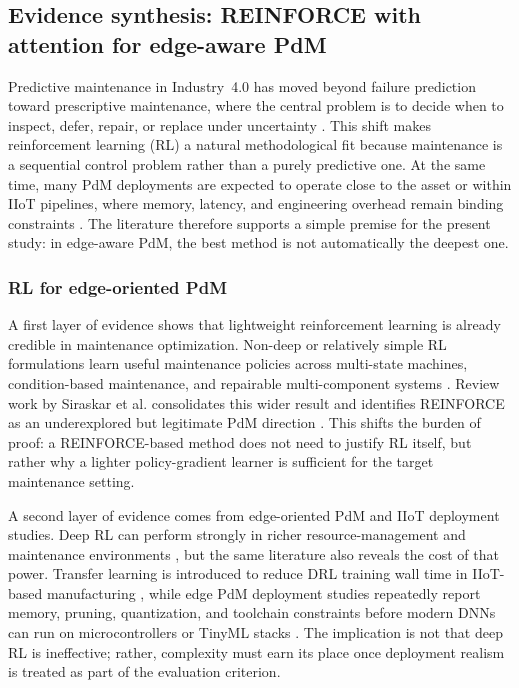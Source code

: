 \documentclass[refree,sn-basic]{sn-jnl} %
\begin{document}
\subsection{Evidence synthesis: REINFORCE with attention for edge-aware PdM}
\label{sec:reinforce_attention_pdm}

Predictive maintenance in Industry~4.0 has moved beyond failure prediction toward prescriptive maintenance, where the central problem is to decide when to inspect, defer, repair, or replace under uncertainty \cite{Com20,Ans19,Sir23,Zha24b}. This shift makes reinforcement learning (RL) a natural methodological fit because maintenance is a sequential control problem rather than a purely predictive one. At the same time, many PdM deployments are expected to operate close to the asset or within IIoT pipelines, where memory, latency, and engineering overhead remain binding constraints \cite{Com20,Pan23,Njo24}. The literature therefore supports a simple premise for the present study: in edge-aware PdM, the best method is not automatically the deepest one.

\subsubsection{RL for edge-oriented PdM}
A first layer of evidence shows that lightweight reinforcement learning is already credible in maintenance optimization. Non-deep or relatively simple RL formulations learn useful maintenance policies across multi-state machines, condition-based maintenance, and repairable multi-component systems \cite{Wan14,Ads20,You20}. Review work by Siraskar et al. consolidates this wider result and identifies REINFORCE as an underexplored but legitimate PdM direction \cite{Sir23}. This shifts the burden of proof: a REINFORCE-based method does not need to justify RL itself, but rather why a lighter policy-gradient learner is sufficient for the target maintenance setting.

A second layer of evidence comes from edge-oriented PdM and IIoT deployment studies. Deep RL can perform strongly in richer resource-management and maintenance environments \cite{Ong22,Ong22b}, but the same literature also reveals the cost of that power. Transfer learning is introduced to reduce DRL training wall time in IIoT-based manufacturing \cite{Ong22b}, while edge PdM deployment studies repeatedly report memory, pruning, quantization, and toolchain constraints before modern DNNs can run on microcontrollers or TinyML stacks \cite{Pan23,Njo24}. The implication is not that deep RL is ineffective; rather, complexity must earn its place once deployment realism is treated as part of the evaluation criterion.
\end{document}
